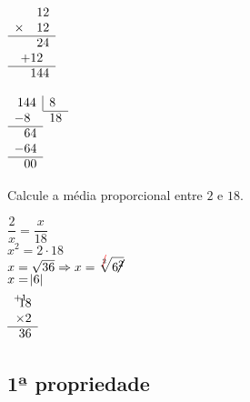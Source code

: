 \begin{enumerate}
\begin{multicols}{3}
	\columnbreak
	$
	\begin{array}{r r r}
	& \multicolumn{2}{r}{12} \\ 
	\times & \multicolumn{2}{r}{12} \\ \cline{1-3}
	& \multicolumn{2}{r}{24} \\
	\multicolumn{3}{c}{+12} \\ \cline{1-3}
	\multicolumn{3}{r}{144}
	\end{array}
	$
	\columnbreak

	$
	\begin{array}{r r r r}
	\multicolumn{2}{r}{144} \vline & \multicolumn{2}{l}{8} \\ \cline{3-4}
	\multicolumn{2}{l}{-8} & \multicolumn{2}{l}{18} \\ \cline{1-2}
	\multicolumn{2}{r}{64} &  \\
	\multicolumn{2}{l}{-64} &  \\\cline{1-2}
	\multicolumn{2}{r}{00} &  \\
	\end{array}
	$
\end{multicols}

Calcule a média proporcional entre $ 2 $ e $ 18 $.

\begin{multicols}{2}
	$ \dfrac{2}{x} = \dfrac{x}{18}$\\
	
	$x^2 = 2 \cdot 18$\\	
	
	$x = \sqrt{36} \Rightarrow x = \sqrt[\color{red}\cancel{\color{black}2}]{6\cancel{^2}}$\\
	
	$x = \abs{6}$\\
	
	\columnbreak
	$
	\begin{array}{r r}
	\multicolumn{2}{l}{_{+1}} \vspace*{-5.5pt} \\
	\multicolumn{2}{r}{18} \\ 
	\multicolumn{2}{r}{\times2} \\ \cline{1-2}
	\multicolumn{2}{r}{36} \\
	\end{array}
	$
\end{multicols}

\subsection{1ª propriedade}


\end{enumerate}
